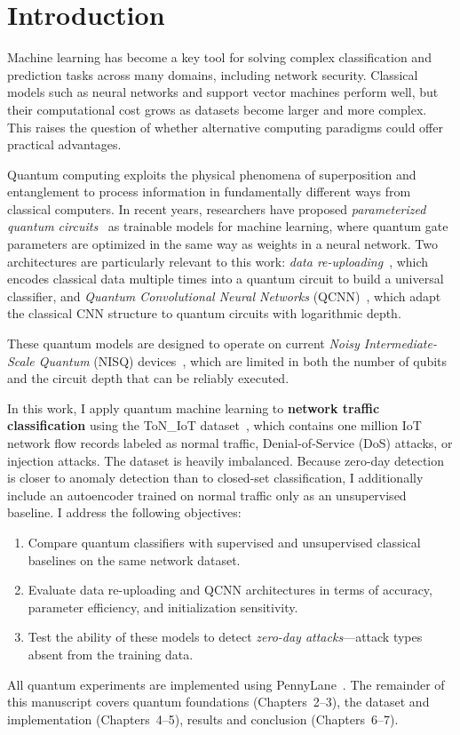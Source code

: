 \chapter{Introduction}
\label{chap:introduction}

Machine learning has become a key tool for solving complex classification and prediction tasks across many domains, including network security. Classical models such as neural networks and support vector machines perform well, but their computational cost grows as datasets become larger and more complex. This raises the question of whether alternative computing paradigms could offer practical advantages.

Quantum computing exploits the physical phenomena of superposition and entanglement to process information in fundamentally different ways from classical computers. In recent years, researchers have proposed \emph{parameterized quantum circuits}~\cite{benedetti2019parameterized} as trainable models for machine learning, where quantum gate parameters are optimized in the same way as weights in a neural network. Two architectures are particularly relevant to this work: \emph{data re-uploading}~\cite{perez2020data}, which encodes classical data multiple times into a quantum circuit to build a universal classifier, and \emph{Quantum Convolutional Neural Networks} (QCNN)~\cite{hur2022quantum}, which adapt the classical CNN structure to quantum circuits with logarithmic depth.

These quantum models are designed to operate on current \emph{Noisy Intermediate-Scale Quantum} (NISQ) devices~\cite{preskill2018quantum}, which are limited in both the number of qubits and the circuit depth that can be reliably executed.

In this work, I apply quantum machine learning to \textbf{network traffic classification} using the ToN\_IoT dataset~\cite{toniot2020dataset}, which contains one million IoT network flow records labeled as normal traffic, Denial-of-Service (DoS) attacks, or injection attacks. The dataset is heavily imbalanced. Because zero-day detection is closer to anomaly detection than to closed-set classification, I additionally include an autoencoder trained on normal traffic only as an unsupervised baseline. I address the following objectives:

\begin{enumerate}[nosep]
    \item Compare quantum classifiers with supervised and unsupervised classical baselines on the same network dataset.
    \item Evaluate data re-uploading and QCNN architectures in terms of accuracy, parameter efficiency, and initialization sensitivity.
    \item Test the ability of these models to detect \emph{zero-day attacks}---attack types absent from the training data.
\end{enumerate}

All quantum experiments are implemented using PennyLane~\cite{pennylane}. The remainder of this manuscript covers quantum foundations (Chapters~2--3), the dataset and implementation (Chapters~4--5), results and conclusion (Chapters~6--7).